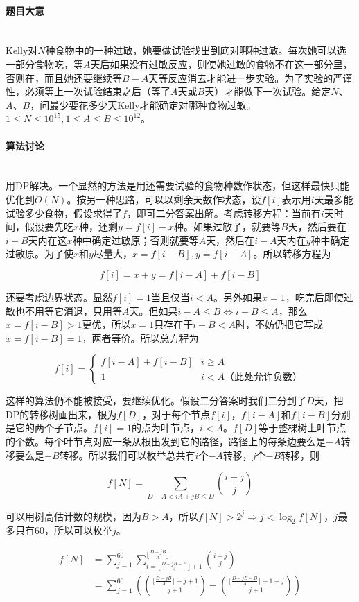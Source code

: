 \documentclass[UTF8]{ctexart}
\newcommand{\myparagraph}[1]{\paragraph{#1}\mbox{}\\}
\theoremstyle{nonumberplain}
\begin{document}
		\myparagraph{题目大意}
	
			Kelly对$N$种食物中的一种过敏，她要做试验找出到底对哪种过敏。每次她可以选一部分食物吃，等$A$天后如果没有过敏反应，则使她过敏的食物不在这一部分里，否则在，而且她还要继续等$B-A$天等反应消去才能进一步实验。为了实验的严谨性，必须等上一次试验结束之后（等了$A$天或$B$天）才能做下一次试验。给定$N$、$A$、$B$，问最少要花多少天Kelly才能确定对哪种食物过敏。$1 \leq N \leq 10^{15}, 1 \leq A \leq B \leq 10^{12}$。
	
		\myparagraph{算法讨论}
		
			用DP解决。一个显然的方法是用还需要试验的食物种数作状态，但这样最快只能优化到$O(N)$。按另一种思路，可以以剩余天数作状态，设$f[i]$表示用$i$天最多能试验多少食物，假设求得了$f$，即可二分答案出解。考虑转移方程：当前有$i$天时间，假设要先吃$x$种，还剩$y=f[i]-x$种。如果过敏了，就要等$B$天，然后要在$i-B$天内在这$x$种中确定过敏原；否则就要等$A$天，然后在$i-A$天内在$y$种中确定过敏原。为了使$x$和$y$尽量大，$x=f[i-B], y=f[i-A]$。所以转移方程为
			
			$$f[i]=x+y=f[i-A]+f[i-B]$$
			
			还要考虑边界状态。显然$f[i]=1$当且仅当$i<A$。另外如果$x=1$，吃完后即使过敏也不用等它消退，只用等$A$天。但如果$i-A \leq B \Leftrightarrow i-B \leq A$，那么$x=f[i-B]>1$更优，所以$x=1$只存在于$i-B<A$时，不妨仍把它写成$x=f[i-B]=1$，两者等价。所以总方程为
			
			$$f[i]=\left\{\begin{array}{ll}
				f[i-A]+f[i-B] & i \geq A \\
				1 & i<A \mbox{（此处允许负数）}
			\end{array}\right.$$
			
			这样的算法仍不能被接受，要继续优化。假设二分答案时我们二分到了$D$天，把DP的转移树画出来，根为$f[D]$，对于每个节点$f[i]$，$f[i-A]$和$f[i-B]$分别是它的两个子节点。$f[i]=1$的点为叶节点，$i<A$。$f[D]$等于整棵树上叶节点的个数。每个叶节点对应一条从根出发到它的路径，路径上的每条边要么是$-A$转移要么是$-B$转移。所以我们可以枚举总共有$i$个$-A$转移，$j$个$-B$转移，则
			
			$$f[N]=\sum_{D-A<iA+jB\leq D}\binom{i+j}{j}$$
			
			可以用树高估计数的规模，因为$B>A$，所以$f[N]>2^j \Rightarrow j<\log_2f[N]$，$j$最多只有60，所以可以枚举$j$。
			
			$$\begin{aligned}
				f[N]&=\sum_{j=1}^{60}\sum_{i=\lfloor \frac{D-jB-B}{A} \rfloor+1}^{\lfloor \frac{D-jB}{A} \rfloor} \binom{i+j}{j} \\
				    &=\sum_{j=1}^{60}(\binom{\lfloor \frac{D-jB}{A} \rfloor+j+1}{j+1}-\binom{\lfloor \frac{D-jB-B}{A} \rfloor+1+j}{j+1})
			\end{aligned}$$
			
\end{document}
